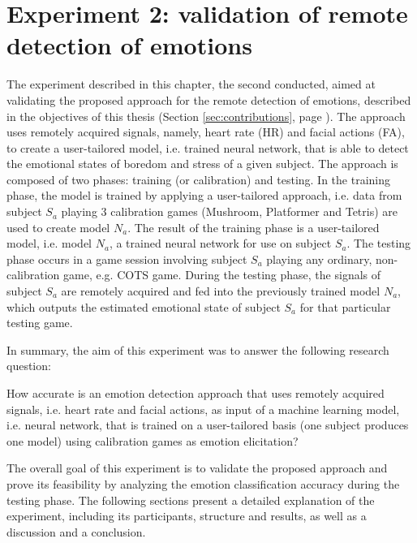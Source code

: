 \chapter{Experiment 2: validation of remote detection of emotions}
\label{ch:experiment2}

The experiment described in this chapter, the second conducted, aimed at validating the proposed approach for the remote detection of emotions, described in the objectives of this thesis (Section \ref{sec:contributions}, page \pageref{sec:contributions}). The approach uses remotely acquired signals, namely, heart rate (HR) and facial actions (FA), to create a user-tailored model, i.e. trained neural network, that is able to detect the emotional states of boredom and stress of a given subject. The approach is composed of two phases: training (or calibration) and testing. In the training phase, the model is trained by applying a user-tailored approach, i.e. data from subject $S_a$ playing 3 calibration games (Mushroom, Platformer and Tetris) are used to create model $N_a$. The result of the training phase is a user-tailored model, i.e. model $N_a$, a trained neural network for use on subject $S_a$. The testing phase occurs in a game session involving subject $S_a$ playing any ordinary, non-calibration game, e.g. COTS game. During the testing phase, the signals of subject $S_a$ are remotely acquired and fed into the previously trained model $N_a$, which outputs the estimated emotional state of subject $S_a$ for that particular testing game.

In summary, the aim of this experiment was to answer the following research question:

\begin{fquote}
How accurate is an emotion detection approach that uses remotely acquired signals, i.e. heart rate and facial actions, as input of a machine learning model, i.e. neural network, that is trained on a user-tailored basis (one subject produces one model) using calibration games as emotion elicitation?
\end{fquote}

The overall goal of this experiment is to validate the proposed approach and prove its feasibility by analyzing the emotion classification accuracy during the testing phase. The following sections present a detailed explanation of the experiment, including its participants, structure and results, as well as a discussion and a conclusion.

